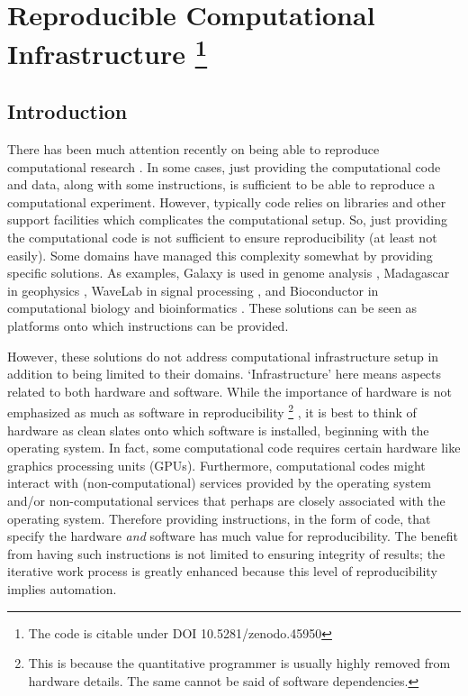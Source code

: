 \chapter{Reproducible Computational Infrastructure%
\protect\footnote{The code is citable under DOI 10.5281/zenodo.45950}
}
\label{ch:pcc}

\section{Introduction}


There has been much attention recently on being able to reproduce computational research \cite{Stodden2013}. 
%
In some cases, just providing the computational code and data, along with some instructions, is sufficient to be able to reproduce a computational experiment.
%
However, typically code relies on libraries and other support facilities which complicates the computational setup.
%
So, just providing the computational code is not sufficient to ensure reproducibility (at least not easily).
%
Some domains have managed this complexity somewhat by providing specific solutions.
%
As examples, \textsf{Galaxy} is used in genome analysis \cite{Giardine2005},
%
\textsf{Madagascar} in geophysics \cite{Fomel2013},
%
\textsf{WaveLab} in signal processing \cite{Buckheit1995},
%
and \textsf{Bioconductor} in computational biology and bioinformatics \cite{Gentleman2004}.
%
These solutions can be seen as platforms onto which instructions can be provided.


However, these solutions do not address computational infrastructure setup in addition to being limited to their domains.
%
`Infrastructure' here means aspects related to both hardware and software.
%
While the importance of hardware is not emphasized as much as software in reproducibility%
\footnote{This is because the quantitative programmer is usually highly removed from hardware details. The same cannot be said of software dependencies.}%
,
it is best to think of hardware as clean slates onto which software is installed, beginning with the operating system.
%
In fact, some computational code requires certain hardware like graphics processing units (GPUs).
%
Furthermore, computational codes might interact with (non-computational) services provided by the operating system and/or non-computational services that perhaps are closely associated with the operating system.
%
Therefore providing instructions, in the form of code, that specify the hardware \emph{and} software has much value for reproducibility.
%
The benefit from having such instructions is not limited to ensuring integrity of results;
%
the iterative work process is greatly enhanced because this level of reproducibility implies automation.


